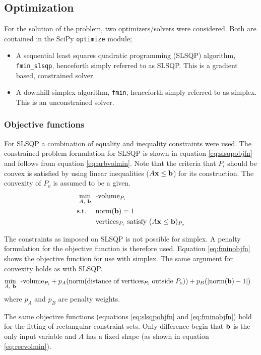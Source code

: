 \subsection{Optimization}
For the solution of the problem, two optimizers/solvers were considered.
Both are contained in the SciPy \texttt{optimize} module;
\begin{itemize}
  \item A sequential least squares quadratic programming (SLSQP) algorithm, \texttt{fmin\_slsqp}, henceforth simply referred to as SLSQP. 
This is a gradient based, constrained solver.
  \item A downhill-simplex algorithm, \texttt{fmin}, henceforth simply referred to as simplex.
This is an unconstrained solver.
\end{itemize}

\subsubsection{Objective functions}
For SLSQP a combination of equality and inequality constraints were used.
The constrained problem formulation for SLSQP is shown in equation \ref{eq:slsqpobjfn} and follows from equation \ref{eq:arbvolmin}.
Note that the criteria that $P_i$ should be convex is satisfied by using linear inequalities ($A{\bf {x}} \leq {\bf {b}}$) for its construction.
The convexity of $P_o$ is assumed to be a given.
\begin{align}
  \label{eq:slsqpobjfn}
    \min_{A,~{\bf {b}}}~~&\text{-volume}_{P_i}\\
    \text{s.t.}~~~~ &\text{norm}({\bf {b}}) = 1 \notag \\
                    &\text{vertices}_{P_i} \text{~satisfy~} (A{\bf {x}}\leq{\bf {b}})_{P_o} \notag  
\end{align}

The constraints as imposed on SLSQP is not possible for simplex.
A penalty formulation for the objective function is therefore used.
Equation \ref{eq:fminobjfn} shows the objective function for use with simplex.
The same argument for convexity holds as with SLSQP.
\begin{align}
  \label{eq:fminobjfn}
    \min_{A,~{\bf {b}}}~~&\text{-volume}_{P_i} + p_A(\text{norm}(\text{distance of vertices$_{P_i}$ outside}~P_o)) + p_B(|\text{norm}({\bf {b}}) - 1|)  
\end{align}
where $p_A$ and $p_B$ are penalty weights.

The same objective functions (equations \ref{eq:slsqpobjfn} and \ref{eq:fminobjfn}) hold for the fitting of rectangular constraint sets.
Only difference begin that ${\bf {b}}$ is the only input variable and $A$ has a fixed shape (as shown in equation \ref{eq:recvolmin}).

